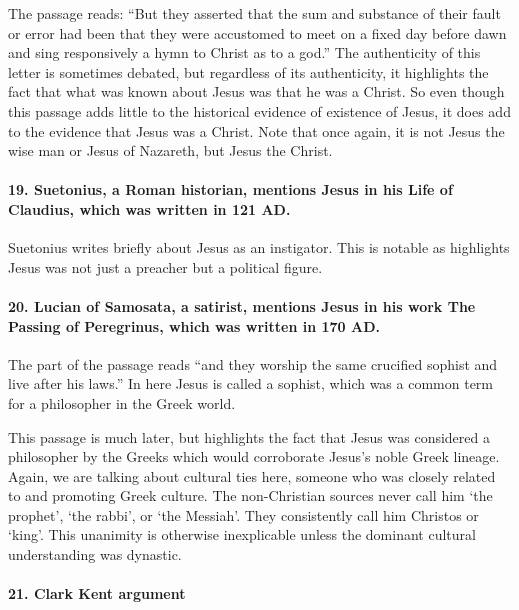 The passage reads: ``But they asserted that the sum and substance of their fault or error had been that they were accustomed to meet on a fixed day before dawn and sing responsively a hymn to Christ as to a god.'' The authenticity of this letter is sometimes debated, but regardless of its authenticity, it highlights the fact that what was known about Jesus was that he was a Christ.
So even though this passage adds little to the historical evidence of existence of Jesus, it does add to the evidence that Jesus was a Christ.
Note that once again, it is not Jesus the wise man or Jesus of Nazareth, but Jesus the Christ.

\paragraph{19.
Suetonius, a Roman historian, mentions Jesus in his Life of Claudius, which was written in 121 AD.}\label{par:suetonius-a-roman-historian-mentions-jesus-in-his-life-of-claudius-which-was-written-in-121-ad.}

Suetonius writes briefly about Jesus as an instigator.
This is notable as highlights Jesus was not just a preacher but a political figure.

\paragraph{20.
Lucian of Samosata, a satirist, mentions Jesus in his work The Passing of Peregrinus, which was written in 170 AD.}\label{par:lucian-of-samosata-a-satirist-mentions-jesus-in-his-work-the-passing-of-peregrinus-which-was-written-in-170-ad.}

The part of the passage reads ``and they worship the same crucified sophist and live after his laws.'' In here Jesus is called a sophist, which was a common term for a philosopher in the Greek world.

This passage is much later, but highlights the fact that Jesus was considered a philosopher by the Greeks which would corroborate Jesus's noble Greek lineage.
Again, we are talking about cultural ties here, someone who was closely related to and promoting Greek culture.
The non-Christian sources never call him ‘the prophet’, ‘the rabbi’, or ‘the Messiah’.
They consistently call him Christos or ‘king’.
This unanimity is otherwise inexplicable unless the dominant cultural understanding was dynastic.

\paragraph{21.
Clark Kent argument}\label{par:clark-kent-argument}

